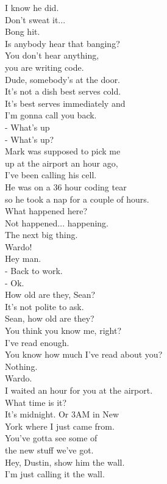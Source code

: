 \documentclass{article}
\begin{document}
\begin{multicols}{3}
I know he did.\\
Don't sweat it...\\
Bong hit.\\
Is anybody hear that banging?\\
You don't hear anything,\\
you are writing code.\\
Dude, somebody's at the door.\\
It's not a dish best serves cold.\\
It's best serves immediately and\\
I'm gonna call you back.\\
- What's up\\
- What's up?\\
Mark was supposed to pick me\\
up at the airport an hour ago,\\
I've been calling his cell.\\
He was on a 36 hour coding tear\\
so he took a nap for a couple of hours.\\
What happened here?\\
Not happened... happening.\\
The next big thing.\\
Wardo!\\
Hey man.\\
- Back to work.\\
- Ok.\\
How old are they, Sean?\\
It's not polite to ask.\\
Sean, how old are they?\\
You think you know me, right?\\
I've read enough.\\
You know how much I've read about you?\\
Nothing.\\
Wardo.\\
I waited an hour for you at the airport.\\
What time is it?\\
It's midnight. Or 3AM in New\\
York where I just came from.\\
You've gotta see some of\\
the new stuff we've got.\\
Hey, Dustin, show him the wall.\\
I'm just calling it the wall.\\

\end{multicols}
\end{document}
